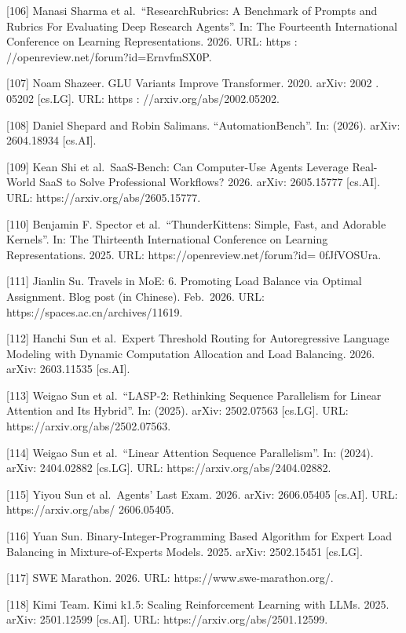 \documentclass[
  10
]{article}
\begin{document}
{[}106{]} Manasi Sharma et al.~``ResearchRubrics: A Benchmark of Prompts
and Rubrics For Evaluating Deep Research Agents''. In: The Fourteenth
International Conference on Learning Representations. 2026. URL: https :
//openreview.net/forum?id=ErnvfmSX0P.

{[}107{]} Noam Shazeer. GLU Variants Improve Transformer. 2020. arXiv:
2002 . 05202 {[}cs.LG{]}. URL: https : //arxiv.org/abs/2002.05202.

{[}108{]} Daniel Shepard and Robin Salimans. ``AutomationBench''. In:
(2026). arXiv: 2604.18934 {[}cs.AI{]}.

{[}109{]} Kean Shi et al.~SaaS-Bench: Can Computer-Use Agents Leverage
Real-World SaaS to Solve Professional Workflows? 2026. arXiv: 2605.15777
{[}cs.AI{]}. URL: https://arxiv.org/abs/2605.15777.

{[}110{]} Benjamin F. Spector et al.~``ThunderKittens: Simple, Fast, and
Adorable Kernels''. In: The Thirteenth International Conference on
Learning Representations. 2025. URL: https://openreview.net/forum?id=
0fJfVOSUra.

{[}111{]} Jianlin Su. Travels in MoE: 6. Promoting Load Balance via
Optimal Assignment. Blog post (in Chinese). Feb.~2026. URL:
https://spaces.ac.cn/archives/11619.

{[}112{]} Hanchi Sun et al.~Expert Threshold Routing for Autoregressive
Language Modeling with Dynamic Computation Allocation and Load
Balancing. 2026. arXiv: 2603.11535 {[}cs.AI{]}.

{[}113{]} Weigao Sun et al.~``LASP-2: Rethinking Sequence Parallelism
for Linear Attention and Its Hybrid''. In: (2025). arXiv: 2502.07563
{[}cs.LG{]}. URL: https://arxiv.org/abs/2502.07563.

{[}114{]} Weigao Sun et al.~``Linear Attention Sequence Parallelism''.
In: (2024). arXiv: 2404.02882 {[}cs.LG{]}. URL:
https://arxiv.org/abs/2404.02882.

{[}115{]} Yiyou Sun et al.~Agents' Last Exam. 2026. arXiv: 2606.05405
{[}cs.AI{]}. URL: https://arxiv.org/abs/ 2606.05405.

{[}116{]} Yuan Sun. Binary-Integer-Programming Based Algorithm for
Expert Load Balancing in Mixture-of-Experts Models. 2025. arXiv:
2502.15451 {[}cs.LG{]}.

{[}117{]} SWE Marathon. 2026. URL: https://www.swe-marathon.org/.

{[}118{]} Kimi Team. Kimi k1.5: Scaling Reinforcement Learning with
LLMs. 2025. arXiv: 2501.12599 {[}cs.AI{]}. URL:
https://arxiv.org/abs/2501.12599.
\end{document}
